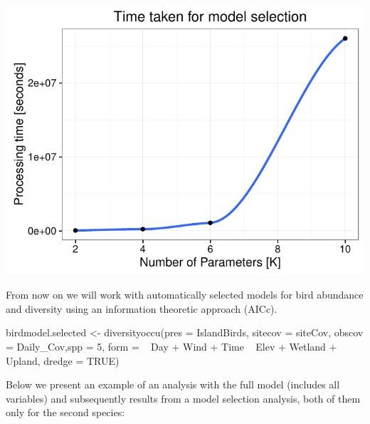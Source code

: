 \documentclass[article]{jss}
\begin{document}
\begin{CodeChunk}


\begin{center}\includegraphics{diversityocc_files/figure-latex/unnamed-chunk-13-1} \end{center}

\end{CodeChunk}

From now on we will work with automatically selected models for bird
abundance and diversity using an information theoretic approach (AICc).

\begin{CodeChunk}
\begin{CodeInput}
birdmodel.selected <- diversityoccu(pres = IslandBirds, sitecov = siteCov,
obscov = Daily_Cov,spp =  5, form = ~ Day + Wind + Time ~ Elev + Wetland + Upland, dredge = TRUE)
\end{CodeInput}
\end{CodeChunk}

Below we present an example of an analysis with the full model (includes
all variables) and subsequently results from a model selection analysis,
both of them only for the second species:
\end{document}
